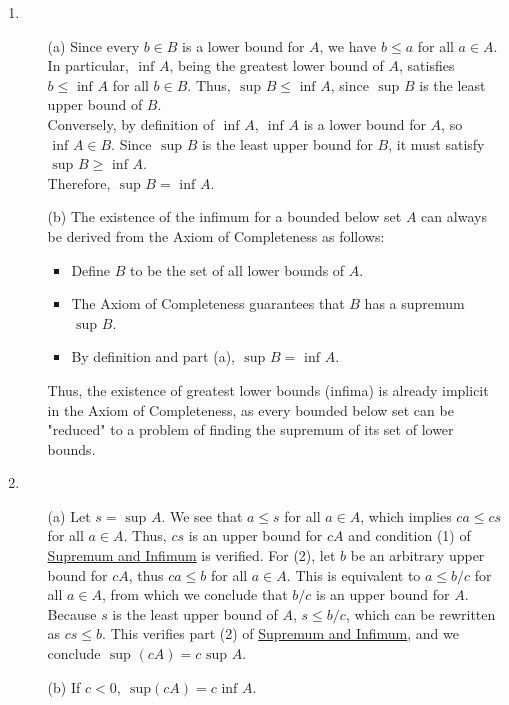 \begin{enumerate}
    \item
      \begin{enumerate}
        \item[(a)] Since every $b \in B$ is a lower bound for $A$, we have $b \leq a$ for all $a \in A$. In particular, $\text{ inf } A$, being the greatest lower bound of $A$, satisfies $b \leq \text{ inf } A$ for all $b \in B$. Thus, $\text{ sup } B \leq \text{ inf } A$, since $\text{ sup } B$ is the least upper bound of $B$. \\
        Conversely, by definition of $\text{ inf } A$, $\text{ inf } A$ is a lower bound for $A$, so $\text{ inf } A \in B$. Since $\text{ sup } B$ is the least upper bound for $B$, it must satisfy $\text{ sup } B \geq \text{ inf } A$. \\
        Therefore, $\text{ sup } B = \text{ inf } A$.
      \item[(b)] The existence of the infimum for a bounded below set $A$ can always be derived from the Axiom of Completeness as follows:
        \begin{itemize}
          \item Define $B$ to be the set of all lower bounds of $A$.
          \item The Axiom of Completeness guarantees that $B$ has a supremum $\text{ sup } B$.
          \item By definition and part (a), $\text{ sup } B = \text{ inf } A$.
        \end{itemize}
        Thus, the existence of greatest lower bounds (infima) is already implicit in the Axiom of Completeness, as every bounded below set can be "reduced" to a problem of finding the supremum of its set of lower bounds.
      \end{enumerate}

    \item 
      \begin{enumerate}
        \item[(a)] Let $s = \text{ sup } A$. We see that $a \leq s$ for all $a \in A$, which implies $ca \leq cs$ for all $a \in A$. Thus, $cs$ is an upper bound for $cA$ and condition (1) of \hyperref[202501180743]{Supremum and Infimum} is verified. For (2), let $b$ be an arbitrary upper bound for $cA$, thus $ca \leq b$ for all $a \in A$. This is equivalent to $a \leq b/c$ for all $a \in A$, from which we conclude that $b/c$ is an upper bound for $A$. Because $s$ is the least upper bound of $A$, $s \leq b/c$, which can be rewritten as $cs \leq b$. This verifies part (2) of \hyperref[202501180743]{Supremum and Infimum}, and we conclude $\text{ sup }(cA) = c \text{ sup } A$. 
        \item[(b)] If $c < 0$, $\text{ sup}(cA) = c \text{ inf } A$.
 
      \end{enumerate}
\end{enumerate}

